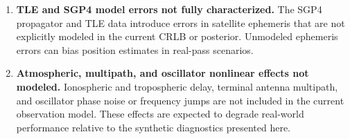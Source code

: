 \begin{enumerate}
  \item \textbf{TLE and SGP4 model errors not fully characterized.}
        The SGP4 propagator and TLE data introduce errors in satellite
        ephemeris that are not explicitly modeled in the current CRLB or
        posterior.  Unmodeled ephemeris errors can bias position estimates
        in real-pass scenarios.

  \item \textbf{Atmospheric, multipath, and oscillator nonlinear effects
        not modeled.}  Ionospheric and tropospheric delay, terminal antenna
        multipath, and oscillator phase noise or frequency jumps are not
        included in the current observation model.  These effects are
        expected to degrade real-world performance relative to the
        synthetic diagnostics presented here.
\end{enumerate}